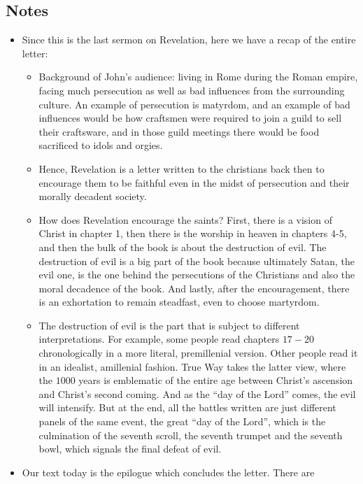\subsection*{Notes}
\begin{itemize}
  \item{Since this is the last sermon on Revelation, here we have a recap of
  the entire letter:
  \begin{itemize}
    \item{Background of John's audience: living in Rome during the Roman
    empire, facing much persecution as well as bad influences from the
    surrounding culture. An example of persecution is matyrdom, and an
    example of bad influences would be how craftsmen were required to join a
    guild to sell their craftsware, and in those guild meetings there would
    be food sacrificed to idols and orgies.}
    \item{Hence, Revelation is a letter written to the christians back then
    to encourage them to be faithful even in the midst of persecution and
    their morally decadent society.}
    \item{How does Revelation encourage the saints? First, there is a vision
    of Christ in chapter 1, then there is the worship in heaven in chapters
    4-5, and then the bulk of the book is about the destruction of evil. The
    destruction of evil is a big part of the book because ultimately Satan,
    the evil one, is the one behind the persecutions of the Christians and
    also the moral decadence of the book. And lastly, after the
    encouragement, there is an exhortation to remain steadfast, even to
    choose martyrdom.}
    \item{The destruction of evil is the part that is subject to different
    interpretations. For example, some people read chapters $17-20$
    chronologically in a more literal, premillenial version. Other people
    read it in an idealist, amillenial fashion. True Way takes the latter
    view, where the $1000$ years is emblematic of the entire age between
    Christ's ascension and Christ's second coming. And as the ``day of the
    Lord'' comes, the evil will intensify. But at the end, all the battles
    written are just different panels of the same event, the great ``day of
    the Lord'', which is the culmination of the seventh scroll, the seventh
    trumpet and the seventh bowl, which signals the final defeat of evil. }
  \end{itemize}}
  \item{Our text today is the epilogue which concludes the letter. There are
}
\end{itemize}
